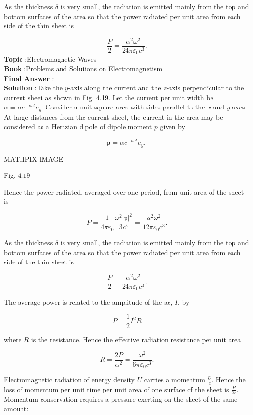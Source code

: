 \documentclass[10pt]{article}
\begin{document}
As the thickness $\delta$ is very small, the radiation is emitted mainly from the top and bottom surfaces of the area so that the power radiated per unit area from each side of the thin sheet is

$$
\frac{P}{2}=\frac{\alpha^{2} \omega^{2}}{24 \pi \varepsilon_{0} c^{3}} .
$$
\textbf{Topic} :Electromagnetic Waves\\
\textbf{Book} :Problems and Solutions on Electromagnetism\\
\textbf{Final Answer} :\\


\textbf{Solution} :Take the $y$-axis along the current and the $z$-axis perpendicular to the current sheet as shown in Fig. 4.19. Let the current per unit width be $\alpha=\alpha e^{-i \omega t} e_{y}$. Consider a unit square area with sides parallel to the $x$ and $y$ axes. At large distances from the current sheet, the current in the area may be considered as a Hertzian dipole of dipole moment $p$ given by

$$
\dot{\mathbf{p}}=\alpha e^{-i \omega t} e_{y} \text {. }
$$

MATHPIX IMAGE

Fig. $4.19$

Hence the power radiated, averaged over one period, from unit area of the sheet is

$$
P=\frac{1}{4 \pi \varepsilon_{0}} \frac{\omega^{2}|\dot{\mathrm{p}}|^{2}}{3 c^{3}}=\frac{\alpha^{2} \omega^{2}}{12 \pi \varepsilon_{0} c^{3}} .
$$

As the thickness $\delta$ is very small, the radiation is emitted mainly from the top and bottom surfaces of the area so that the power radiated per unit area from each side of the thin sheet is

$$
\frac{P}{2}=\frac{\alpha^{2} \omega^{2}}{24 \pi \varepsilon_{0} c^{3}} .
$$

 The average power is related to the amplitude of the ac, $I$, by

$$
P=\frac{1}{2} I^{2} R
$$

where $R$ is the resistance. Hence the effective radiation resistance per unit area

$$
R=\frac{2 P}{\alpha^{2}}=\frac{\omega^{2}}{6 \pi \varepsilon_{0} c^{3}} .
$$

 Electromagnetic radiation of energy density $U$ carries a momentum $\frac{U}{c}$. Hence the loss of momentum per unit time per unit area of one surface of the sheet is $\frac{P}{2 c}$. Momentum conservation requires a pressure exerting on the sheet of the same amount:
\end{document}
